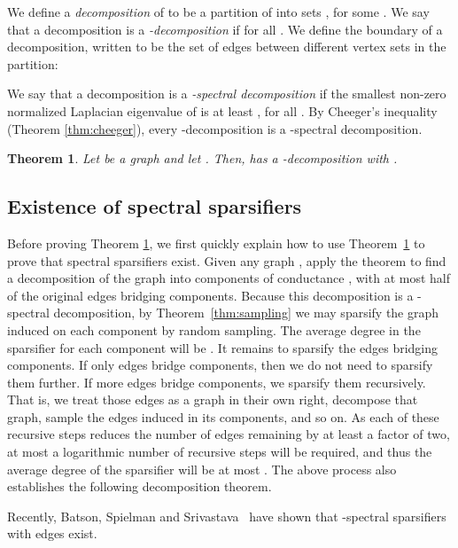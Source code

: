 \documentclass[11pt]{article}
\newtheorem{theorem}{Theorem}[section]
\begin{document}
We define a \emph{decomposition} of  to be a partition of  into sets
  , for some .
We say that a decomposition is 
  a \emph{-decomposition} if
   for all .
We define the boundary of a decomposition, written
   to be the set of edges between different
  vertex sets in the partition:

We say that a decomposition  is a
  \emph{-spectral decomposition}
  if the smallest non-zero normalized Laplacian eigenvalue of
   is at least , for all .
By Cheeger's inequality (Theorem \ref{thm:cheeger}),
  every -decomposition is a -spectral decomposition.

\begin{theorem}\label{thm:graphDecompExist}
Let  be a graph and let .
Then,  has a -decomposition with
.
\end{theorem}


\subsection{Existence of spectral sparsifiers}\label{sec:existence}
Before proving Theorem \ref{thm:graphDecompExist},
  we first quickly explain how to use Theorem~\ref{thm:graphDecompExist}
  to prove that spectral sparsifiers exist.
Given any graph , apply the theorem to find a decomposition of the graph
  into components of conductance , with at most half of the
  original edges bridging components.
Because this decomposition is a -spectral decomposition,
by Theorem~\ref{thm:sampling} we may sparsify the graph induced on
  each component by random sampling.
The average degree in the sparsifier for each component will be
  .
It remains to sparsify the edges bridging components.
If only  edges bridge components, then we do not need to sparsify
  them further.
If more edges bridge components, we sparsify them recursively.
That is, we treat those edges as a graph in their own right,
  decompose that graph, sample the edges induced in its components,
  and so on.
As each of these recursive steps reduces the number of edges remaining
  by at least a factor of two,
  at most a logarithmic number of recursive steps will be required, and thus the
  average degree of the sparsifier will be at most .
The above process also establishes the following decomposition theorem.







Recently, Batson, Spielman and Srivastava~\cite{BatsonSpielmanSrivastava}
  have shown that -spectral sparsifiers with 
  edges exist.
\end{document}
